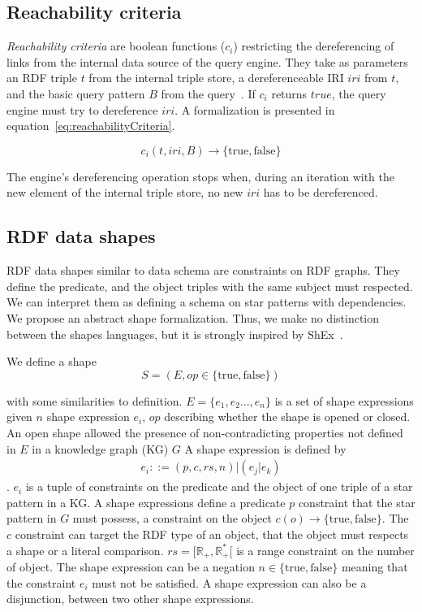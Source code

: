 \subsection{Reachability criteria}

\emph{Reachability criteria} are boolean functions ($c_i$) restricting the dereferencing of links from the internal data source of the query engine.
They take as parameters an RDF triple $t$ from the internal triple store, a dereferenceable IRI $iri$ from $t$, and the basic query pattern $B$ from the query~\cite{Hartig2012}.
If $c_i$ returns $true$, the query engine must try to dereference $iri$.
A formalization is presented in equation~\ref{eq:reachabilityCriteria}.


\begin{equation}\label{eq:reachabilityCriteria}
c_i(t, iri, B) \rightarrow \{\mathrm{true}, \mathrm{false}\}
\end{equation}

The engine's dereferencing operation stops when, during an iteration with the new element of the internal triple store, no new $iri$ has to be dereferenced.

\subsection{RDF data shapes}
RDF data shapes similar to data schema are constraints on RDF graphs.
They define the predicate, and the object triples with the same subject must respected.
We can interpret them as defining a schema on star patterns with dependencies.
We propose an abstract shape formalization. 
Thus, we make no distinction between the shapes languages, but it is strongly inspired by ShEx~\cite{Gayo2018}.~

We define a shape
\begin{equation}
S = (E, op \in \{\mathrm{true},\mathrm{false}\})
\end{equation}

with some similarities to \citeauthor{Abbas2018} definition.
$E = \{e_1, e_2 ..., e_{n}\}$ is a set of shape expressions given $n$ shape expression $e_i$, $op$ describing whether the shape is opened or closed.
An open shape allowed the presence of non-contradicting properties not defined in $E$ in a knowledge graph (KG) $G$
A shape expression is defined by
\begin{align}
 e_i ::= (p, c, rs, n) | (e_j|e_k)
\end{align}
.
$e_i$ is a tuple of constraints on the predicate and the object of one triple of a star pattern in a KG. 
A shape expressions define a predicate $p$ constraint that the star pattern in $G$ must possess,
a constraint on the object $c(o) \rightarrow \{\mathrm{true}, \mathrm{false}\}$.
The $c$ constraint can target the RDF type of an object, that the object must respects a shape or a literal comparison.
$rs = [\mathbb{R}_+, \mathbb{R}_{+}^{*}[$ is a range constraint on the number of object.
The shape expression can be a negation $n \in \{\mathrm{true}, \mathrm{false}\}$ meaning that the constraint $e_i$ must not be satisfied.
A shape expression can also be a disjunction, between two other shape expressions.

